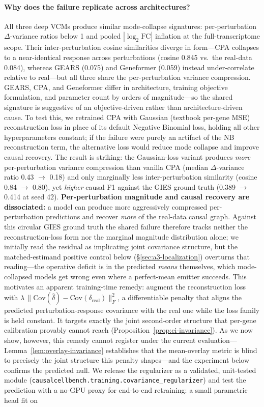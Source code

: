 \documentclass{article}
\theoremstyle{plain}
\theoremstyle{definition}
\theoremstyle{remark}
\begin{document}
\paragraph{Why does the failure replicate across architectures?}
All three deep VCMs produce similar mode-collapse signatures: per-perturbation $\Delta$-variance ratios below 1 and pooled $|\log_2 \mathrm{FC}|$ inflation at the full-transcriptome scope. Their inter-perturbation cosine similarities diverge in form---CPA collapses to a near-identical response across perturbations (cosine 0.845 vs.\ the real-data 0.084), whereas GEARS (0.075) and Geneformer (0.059) instead under-correlate relative to real---but all three share the per-perturbation variance compression. GEARS, CPA, and Geneformer differ in architecture, training objective formulation, and parameter count by orders of magnitude---so the shared signature is suggestive of an objective-driven rather than architecture-driven cause. To test this, we retrained CPA with Gaussian (textbook per-gene MSE) reconstruction loss in place of its default Negative Binomial loss, holding all other hyperparameters constant; if the failure were purely an artifact of the NB reconstruction term, the alternative loss would reduce mode collapse and improve causal recovery. The result is striking: the Gaussian-loss variant produces \emph{more} per-perturbation variance compression than vanilla CPA (median $\Delta$-variance ratio 0.43 $\to$ 0.18) and only marginally less inter-perturbation similarity (cosine 0.84 $\to$ 0.80), yet \emph{higher} causal F1 against the GIES ground truth (0.389 $\to$ 0.414 at seed 42). \textbf{Per-perturbation magnitude and causal recovery are dissociated:} a model can produce more aggressively compressed per-perturbation predictions and recover \emph{more} of the real-data causal graph. Against this circular GIES ground truth the shared failure therefore tracks neither the reconstruction-loss form nor the marginal magnitude distribution alone; we initially read the residual as implicating joint covariance structure, but the matched-estimand positive control below (\S\ref{sec:a3-localization}) overturns that reading---the operative deficit is in the predicted \emph{means} themselves, which mode-collapsed models get wrong even where a perfect-mean emitter succeeds. This motivates an apparent training-time remedy: augment the reconstruction loss with $\lambda\,\lVert \mathrm{Cov}(\hat\delta) - \mathrm{Cov}(\delta_{\text{real}})\rVert_F^2$, a differentiable penalty that aligns the predicted perturbation-response covariance with the real one while the loss family is held constant. It targets exactly the joint second-order structure that per-gene calibration provably cannot reach (Proposition~\ref{prop:ci-invariance}). As we now show, however, this remedy cannot register under the current evaluation---Lemma~\ref{lem:overlay-invariance} establishes that the mean-overlay metric is blind to precisely the joint structure this penalty shapes---and the experiment below confirms the predicted null. We release the regularizer as a validated, unit-tested module (\texttt{causalcellbench.training.covariance\_regularizer}) and test the prediction with a no-GPU proxy for end-to-end retraining: a small parametric head fit on 
\end{document}
